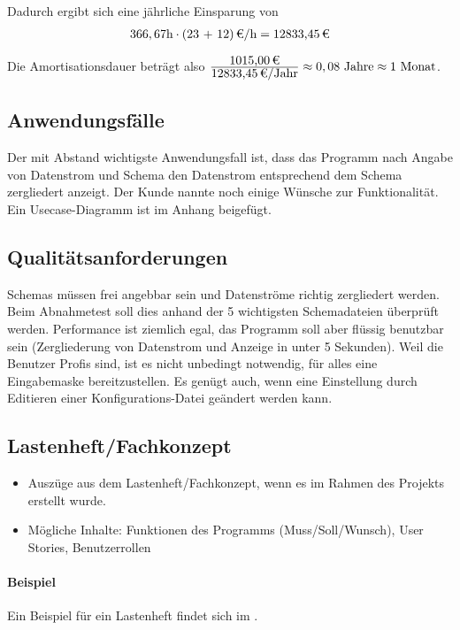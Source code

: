 Dadurch ergibt sich eine jährliche Einsparung von 
\begin{eqnarray}
366,67 \mbox{h} \cdot \eur{(23 + 12)}{\mbox{/h}} = \eur{12833,45}
\end{eqnarray}

Die Amortisationsdauer beträgt also $\frac{\eur{1015,00}}{\eur{12833,45}\mbox{/Jahr}} \approx 0,08 \mbox{ Jahre} \approx 1 \mbox{ Monat}$.


\subsection{Anwendungsfälle}
\label{sec:Anwendungsfaelle}
Der mit Abstand wichtigste Anwendungsfall ist, dass das Programm nach Angabe von Datenstrom und Schema den Datenstrom entsprechend dem Schema zergliedert anzeigt.
Der Kunde nannte noch einige Wünsche zur Funktionalität. Ein Usecase-Diagramm ist im Anhang beigefügt.


\subsection{Qualitätsanforderungen}
\label{sec:Qualitaetsanforderungen}
Schemas müssen frei angebbar sein und Datenströme richtig zergliedert werden.
Beim Abnahmetest soll dies anhand der 5 wichtigsten Schemadateien überprüft werden.
Performance ist ziemlich egal, das Programm soll aber flüssig benutzbar sein (Zergliederung von Datenstrom und Anzeige in unter 5 Sekunden).
Weil die Benutzer Profis sind, ist es nicht unbedingt notwendig, für alles eine Eingabemaske bereitzustellen. Es genügt auch, wenn eine Einstellung durch Editieren einer Konfigurations-Datei geändert werden kann.


\subsection{Lastenheft/Fachkonzept}
\label{sec:Lastenheft}
\begin{itemize}
	\item Auszüge aus dem Lastenheft/Fachkonzept, wenn es im Rahmen des Projekts erstellt wurde.
	\item Mögliche Inhalte: Funktionen des Programms (Muss/Soll/Wunsch), User Stories, Benutzerrollen
\end{itemize}

\paragraph{Beispiel}
Ein Beispiel für ein Lastenheft findet sich im . 


